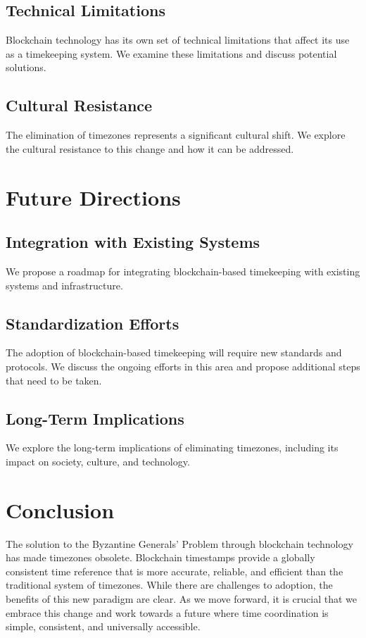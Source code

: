 \documentclass[12pt]{report}
\begin{document}
\section{Technical Limitations}
Blockchain technology has its own set of technical limitations that affect its use as a timekeeping system. We examine these limitations and discuss potential solutions.

\section{Cultural Resistance}
The elimination of timezones represents a significant cultural shift. We explore the cultural resistance to this change and how it can be addressed.

\chapter{Future Directions}

\section{Integration with Existing Systems}
We propose a roadmap for integrating blockchain-based timekeeping with existing systems and infrastructure.

\section{Standardization Efforts}
The adoption of blockchain-based timekeeping will require new standards and protocols. We discuss the ongoing efforts in this area and propose additional steps that need to be taken.

\section{Long-Term Implications}
We explore the long-term implications of eliminating timezones, including its impact on society, culture, and technology.

\chapter{Conclusion}

The solution to the Byzantine Generals' Problem through blockchain technology has made timezones obsolete. Blockchain timestamps provide a globally consistent time reference that is more accurate, reliable, and efficient than the traditional system of timezones. While there are challenges to adoption, the benefits of this new paradigm are clear. As we move forward, it is crucial that we embrace this change and work towards a future where time coordination is simple, consistent, and universally accessible.
\end{document}
